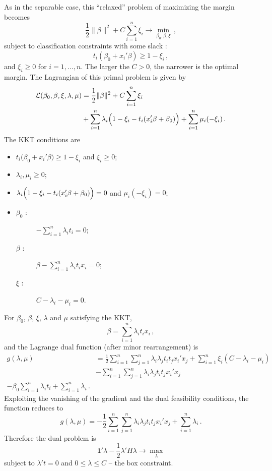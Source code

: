 \documentclass[a4paper]{article}
\newcommand{\one}{\mathbf{1}}
\newcommand{\Lcal}{\mathcal{L}}
\begin{document}
As in the separable case, this ``relaxed'' problem of maximizing the margin becomes
\[ \frac{1}{2} \|\beta\|^2 + C \sum_{i=1}^n \xi_i \to \min_{\beta_0,\beta, \xi}\,, \]
subject to classification constraints with some slack :
\[ t_i( \beta_0 + x_i'\beta ) \geq 1 - \xi_i \,, \]
and $\xi_i\geq 0$ for $i=1,\ldots,n$. The larger the $C>0$, the narrower is the optimal
margin. The Lagrangian of this primal problem is given by
\begin{align*}
	\Lcal(\beta_0,\beta,\xi, \lambda,\mu)
	&= \frac{1}{2} \|\beta\|^2 + C \sum_{i=1}^n \xi_i \\
	&+ \sum_{i=1}^n \lambda_i \Bigl( 1 - \xi_i - t_i ( x_i'\beta + \beta_0 ) \Bigr)
	+ \sum_{i=1}^n \mu_i ( - \xi_i )\,.
\end{align*}
The KKT conditions are \begin{itemize}
	\item $t_i \bigl( \beta_0 + x_i'\beta \bigr) \geq 1 - \xi_i$ and $\xi_i \geq 0$;
	\item $\lambda_i,\mu_i \geq 0$;
	\item $\lambda_i \Bigl( 1 - \xi_i - t_i ( x_i'\beta + \beta_0 ) \Bigr) = 0$
		and $\mu_i ( - \xi_i ) = 0$;
	\item \begin{description}
		\item[$\beta_0$ :] $ -\sum_{i=1}^n \lambda_i t_i = 0$;
		\item[$\beta$ :] $ \beta - \sum_{i=1}^n \lambda_i t_i x_i = 0$;
		\item[$\xi$ :] $ C - \lambda_i - \mu_i = 0$.
	\end{description}
\end{itemize}
For $\beta_0$, $\beta$, $\xi$, $\lambda$ and $\mu$ satisfying the KKT,
\[ \beta = \sum_{i=1}^n \lambda_i t_i x_i\,, \]
and the Lagrange dual function (after minor rearrangement) is
\begin{align*}
	g(\lambda,\mu)
	& = \frac{1}{2} \sum_{i=1}^n \sum_{j=1}^n \lambda_i \lambda_j t_i t_j x_i'x_j
		+ \sum_{i=1}^n \xi_i ( C - \lambda_i - \mu_i ) \\
	&- \sum_{i=1}^n \sum_{j=1}^n \lambda_i \lambda_j t_i t_j x_i'x_j \\
		- \beta_0 \sum_{i=1}^n \lambda_i t_i
		+ \sum_{i=1}^n \lambda_i \,.
\end{align*}
Exploiting the vanishing of the gradient and the dual feasibility conditions, the
function reduces to
\[
g(\lambda,\mu) =
- \frac{1}{2} \sum_{i=1}^n\sum_{j=1}^n \lambda_i\lambda_j t_i t_j x_i'x_j
+ \sum_{i=1}^n \lambda_i \,.
\]
Therefore the dual problem is
\[ \one' \lambda - \frac{1}{2}\lambda'H\lambda \to \max_\lambda \]
subject to $\lambda't = 0$ and $0\leq \lambda\leq C$ -- the box constraint.
\end{document}
